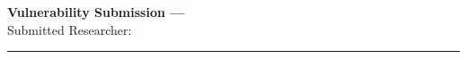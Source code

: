 \documentclass[11pt,a4paper]{article}
\begin{document}
\sffamily

{\Large\bfseries\sffamily\color{PrimaryDark} Vulnerability Submission --- \reporttarget}\\[4pt]
{\small\color{MedGray} Submitted \reportdate\quad\textbar\quad Researcher: }
\vspace{0.6cm}
\hrule
\vspace{0.6cm}


\end{document}
